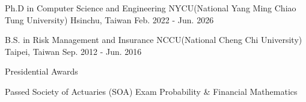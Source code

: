 

\begin{cventries}

  \cventry
    {Ph.D in Computer Science and Engineering} %
    {NYCU(National Yang Ming Chiao Tung University)} %
    {Hsinchu, Taiwan} %
    {Feb. 2022 - Jun. 2026} %
    {
      \begin{cvitems} %
      \end{cvitems}
    }

  \cventry
    {B.S. in Risk Management and Insurance} %
    {NCCU(National Cheng Chi University)} %
    {Taipei, Taiwan} %
    {Sep. 2012 - Jun. 2016} %
    {
      \begin{cvitems} %
        \item {Presidential Awards}
        \item {Passed Society of Actuaries (SOA) Exam Probability \& Financial Mathematics}
      \end{cvitems}
    }

\end{cventries}
